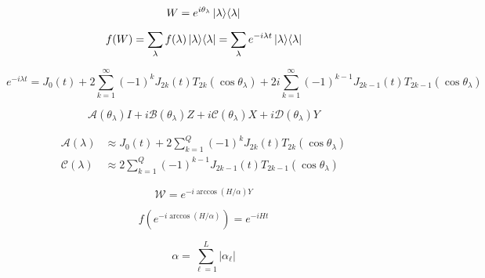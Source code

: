 \documentclass[11pt, oneside]{article}   	%
\begin{document}
\begin{equation*}
W = e^{i \theta_{\lambda}} \ket{\lambda} \! \bra{\lambda} 
\end{equation*}

\begin{equation*}
f(W) = \sum_{\lambda} f(\lambda) \ket{\lambda} \! \bra{\lambda} = \sum_{\lambda} e^{-i \lambda t} \ket{\lambda} \! \bra{\lambda}
\end{equation*}

\begin{equation*}
e^{-i \lambda t} = J_0(t) + 2 \sum^{\infty}_{k=1} (-1)^{k} J_{2k}(t) T_{2k}(\cos \theta_{\lambda}) + 2i \sum^{\infty}_{k=1} (-1)^{k-1} J_{2k-1}(t) T_{2k-1}(\cos \theta_{\lambda}) 
\end{equation*}

\begin{equation*}
\mathcal{A}(\theta_{\lambda}) I + i \mathcal{B}(\theta_{\lambda}) Z + i \mathcal{C}(\theta_{\lambda}) X + i \mathcal{D}(\theta_{\lambda}) Y
\end{equation*}

\begin{align*} 
\mathcal{A}(\lambda)
&\approx J_0(t) + 2 \sum^{Q}_{k=1} (-1)^{k} J_{2k}(t) T_{2k}(\cos \theta_{\lambda}) \\
\mathcal{C}(\lambda)
&\approx 2 \sum^{Q}_{k=1} (-1)^{k-1} J_{2k-1}(t) T_{2k-1}(\cos \theta_{\lambda})
\end{align*}

\begin{equation*}
\mathcal{W} = e^{-i \arccos (H/\alpha) Y}
\end{equation*}

\begin{equation*}
f (e^{-i \arccos (H/\alpha)}) = e^{-i H t}
\end{equation*}

\begin{equation*}
\alpha = \sum^L_{\ell=1} | \alpha_{\ell} |
\end{equation*}




\end{document}
